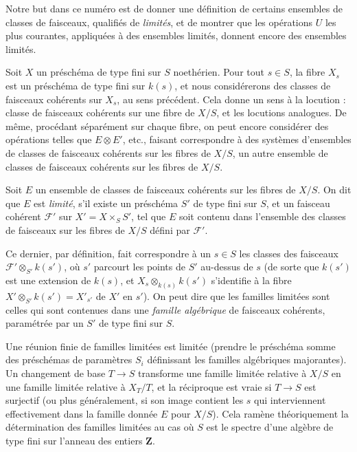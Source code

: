 Notre but dans ce numéro est de donner une définition de certains ensembles de
classes de faisceaux, qualifiés de \emph{limités}, et de montrer que les
opérations $U$ les plus courantes, appliquées à des ensembles limités, donnent
encore des ensembles limités.

Soit $X$ un préschéma de type fini sur $S$ noethérien. Pour tout $s\in S$, la
fibre $X_s$ est un préschéma de type fini sur $k(s)$, et nous considérerons des
classes de faisceaux cohérents sur $X_s$, au sens précédent. Cela donne un sens
à la locution : classe de faisceaux cohérents sur une fibre de $X/S$, et les
locutions analogues. De même, procédant séparément sur chaque fibre, on peut
encore considérer des opérations telles que $E\otimes E'$, etc., faisant
correspondre à des systèmes d'ensembles de
classes de faisceaux cohérents sur les fibres de $X/S$, un autre ensemble de
classes de faisceaux cohérents sur les fibres de $X/S$.

 Soit $E$ un ensemble de classes de faisceaux cohérents
sur les fibres de $X/S$. On dit que $E$ est \emph{limité}, s'il existe un
préschéma $S'$ de type fini sur $S$, et un faisceau cohérent $\mathcal F'$ sur
$X'=X\times_S S'$, tel que $E$ soit contenu dans l'ensemble des classes de
faisceaux sur les fibres de $X/S$ défini par $\mathcal F'$.

Ce dernier, par définition, fait correspondre à un $s\in S$ les classes des
faisceaux $\mathcal F'\otimes_{S'}k(s')$, où $s'$ parcourt les points de $S'$
au-dessus de $s$ (de sorte que $k(s')$ est une extension de $k(s)$, et
$X_s\otimes_{k(s)}k(s')$ s'identifie à la fibre
$X'\otimes_{S'}k(s')=X'_{s'}$ de $X'$ en $s'$). On peut dire que les familles
limitées sont celles qui sont contenues dans une \emph{famille algébrique} de
faisceaux cohérents, paramétrée par un $S'$ de type fini sur $S$.

Une réunion finie de familles limitées est limitée (prendre le préschéma somme
des préschémas de paramètres $S_i$ définissant les familles algébriques
majorantes). Un changement de base $T\longrightarrow S$ transforme une famille
limitée relative à $X/S$ en une famille limitée relative à $X_T/T$, et la
réciproque est vraie si $T\longrightarrow S$ est surjectif (ou plus
généralement, si son image contient les $s$ qui interviennent effectivement
dans la famille donnée $E$ pour $X/S$). Cela ramène théoriquement la
détermination des familles limitées au cas où $S$ est le spectre d'une algèbre
de type fini sur l'anneau des entiers $\mathbf Z$.


